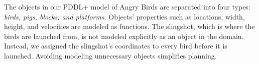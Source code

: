 \documentclass[letterpaper]{article} %
\begin{document}
The objects in our PDDL+ model of Angry Birds are separated into four types: \textit{birds, pigs, blocks, and platforms}. 
Objects' properties such as locations, width, height, and velocities are modeled as functions. %
The slingshot, which is where the birds are launched from, is not modeled explicitly as an object in the domain. Instead, we assigned the slingshot's coordinates to every bird before it is launched.
Avoiding modeling unnecessary objects  
simplifies planning. %
\end{document}
